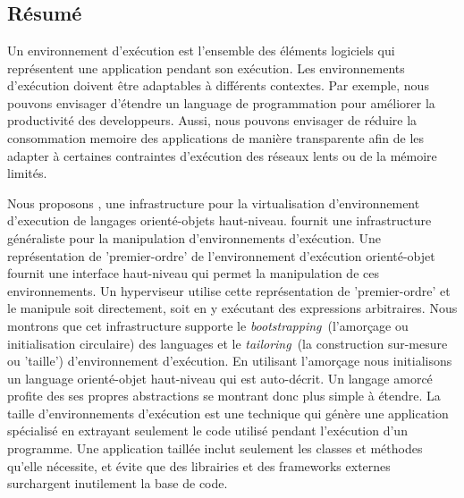 \documentclass[a4paper,11pt,twoside]{include/ThesisStyle}
\begin{document}





\appendix


%

\chapter*{}
\section*{Résumé}
\footnotesize
Un environnement d'exécution est l'ensemble des éléments logiciels qui représentent une application pendant son exécution. Les environnements d'exécution doivent être adaptables à différents contextes. Par exemple, nous pouvons envisager d'étendre un language de programmation pour améliorer la productivité des developpeurs. Aussi, nous pouvons envisager de réduire la consommation memoire des applications de manière transparente afin de les adapter à certaines contraintes d'exécution \eg des réseaux lents ou de la mémoire limités.

Nous proposons \Vtt, une infrastructure pour la virtualisation d'environnement d'execution de langages orienté-objets haut-niveau. \Vtt fournit une infrastructure généraliste pour la manipulation d'environnements d'exécution. Une représentation de 'premier-ordre' de l'environnement d'exécution orienté-objet fournit une interface haut-niveau qui permet la manipulation de ces environnements. Un hyperviseur utilise cette représentation de 'premier-ordre' et le manipule soit directement, soit en y exécutant des expressions arbitraires.
Nous montrons que cet infrastructure supporte le \emph{bootstrapping}~(\ie l'amorçage ou initialisation circulaire) des languages et le \emph{tailoring}~(\ie la construction sur-mesure ou 'taille') d'environnement d'exécution. En utilisant l'amorçage nous initialisons un language orienté-objet haut-niveau qui est auto-décrit. Un langage amorcé profite des ses propres abstractions se montrant donc plus simple à étendre. La taille d'environnements d'exécution est une technique qui génère une application spécialisé en extrayant seulement le code utilisé pendant l'exécution d'un programme. Une application taillée inclut seulement les classes et méthodes qu'elle nécessite, et évite que des librairies et des frameworks externes surchargent inutilement la base de code.
\end{document}
